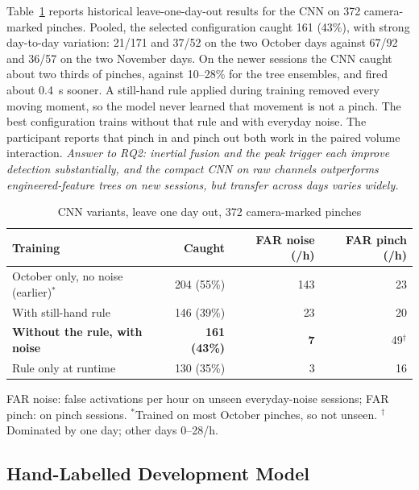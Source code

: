 Table~\ref{tab:lodo} reports historical leave-one-day-out results for the CNN on 372 camera-marked pinches. Pooled, the selected configuration caught 161 (43\%), with strong day-to-day variation: 21/171 and 37/52 on the two October days against 67/92 and 36/57 on the two November days. On the newer sessions the CNN caught about two thirds of pinches, against 10--28\% for the tree ensembles, and fired about 0.4~s sooner. A still-hand rule applied during training removed every moving moment, so the model never learned that movement is not a pinch. The best configuration trains without that rule and with everyday noise. The participant reports that pinch in and pinch out both work in the paired volume interaction. \emph{Answer to RQ2: inertial fusion and the peak trigger each improve detection substantially, and the compact CNN on raw channels outperforms engineered-feature trees on new sessions, but transfer across days varies widely.}

\begin{table}[t]
  \centering
  \caption{CNN variants, leave one day out, 372 camera-marked pinches}
  \label{tab:lodo}
  \small
  \begin{tabular}{@{}lrrr@{}}
    \toprule
    Training & Caught & FAR noise (/h) & FAR pinch (/h) \\
    \midrule
    October only, no noise (earlier)$^\ast$ & 204 (55\%) & 143 & 23 \\
    With still-hand rule & 146 (39\%) & 23 & 20 \\
    \textbf{Without the rule, with noise} & \textbf{161 (43\%)} & \textbf{7} & 49$^\dagger$ \\
    Rule only at runtime & 130 (35\%) & 3 & 16 \\
    \bottomrule
  \end{tabular}\par\smallskip
  {\footnotesize FAR noise: false activations per hour on unseen everyday-noise sessions; FAR pinch: on pinch sessions.
  $^\ast$Trained on most October pinches, so not unseen. $^\dagger$Dominated by one day; other days 0--28/h.\par}
\end{table}

\subsection{Hand-Labelled Development Model}\label{sec:hand}

